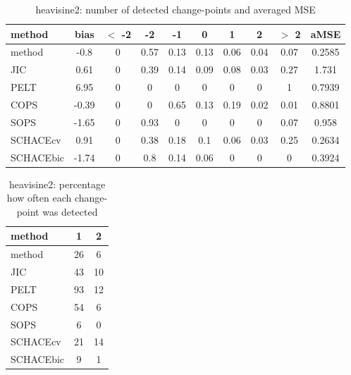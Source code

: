 \begin{table}[ht]
\centering
\begin{tabular}{l|c|ccccccc|c}
  \hline
method & bias & $<$ -2 & -2 & -1 & 0 & 1 & 2 & $>$ 2 & aMSE \\ 
  \hline
method &  -0.8 &     0 &  0.57 &  0.13 &  0.13 &  0.06 &  0.04 &  0.07 & 0.2585 \\ 
  JIC &  0.61 &     0 &  0.39 &  0.14 &  0.09 &  0.08 &  0.03 &  0.27 & 1.731 \\ 
  PELT &  6.95 &     0 &     0 &     0 &     0 &     0 &     0 &     1 & 0.7939 \\ 
  COPS & -0.39 &     0 &     0 &  0.65 &  0.13 &  0.19 &  0.02 &  0.01 & 0.8801 \\ 
  SOPS & -1.65 &     0 &  0.93 &     0 &     0 &     0 &     0 &  0.07 & 0.958 \\ 
  SCHACEcv &  0.91 &     0 &  0.38 &  0.18 &   0.1 &  0.06 &  0.03 &  0.25 & 0.2634 \\ 
  SCHACEbic & -1.74 &     0 &   0.8 &  0.14 &  0.06 &     0 &     0 &     0 & 0.3924 \\ 
   \hline
\end{tabular}
\caption{heavisine2: number of detected change-points and averaged MSE} 
\label{tab:heavisine2Njumps}
\end{table}
\begin{table}[ht]
\centering
\begin{tabular}{l|cc}
  \hline
method & 1 & 2 \\ 
  \hline
method &     26 &      6 \\ 
  JIC &     43 &     10 \\ 
  PELT &     93 &     12 \\ 
  COPS &     54 &      6 \\ 
  SOPS &      6 &      0 \\ 
  SCHACEcv &     21 &     14 \\ 
  SCHACEbic &      9 &      1 \\ 
   \hline
\end{tabular}
\caption{heavisine2: percentage how often each change-point was detected} 
\label{tab:heavisine2Detections}
\end{table}

